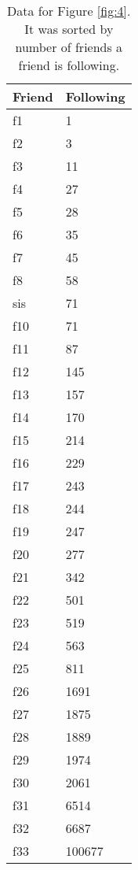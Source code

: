 \begin{table}[!htbp]
	\caption{Twitter Following Friends Data} \label{tab:table4}
	\small
	\begin{center}
	\vspace{-5mm}
	\begin{minipage}{0.22\textwidth}
		\begin{tabular}{|l | l|}
			\hline
			\multicolumn{1}{|c|}{Friend} & \multicolumn{1}{c|}{Following}\\
			\hline
			f1  & 1\\
			f2  & 3\\
			f3  & 11\\
			f4  & 27\\
			f5  & 28\\
			f6  & 35\\
			f7  & 45\\
			f8  & 58\\
			sis  & 71\\
			f10  & 71\\
			f11  & 87\\
			f12  & 145\\
			f13  & 157\\
			f14  & 170\\
			f15  & 214\\
			f16  & 229\\
			f17  & 243\\
			f18  & 244\\
			f19  & 247\\
			f20  & 277\\
			f21  & 342\\
			f22  & 501\\
			f23  & 519\\
			f24  & 563\\
			f25  & 811\\
			f26  & 1691\\
			f27  & 1875\\
			f28  & 1889\\
			f29  & 1974\\
			f30  & 2061\\
			f31  & 6514\\
			f32  & 6687\\
			f33  & 100677\\
			\hline
		\end{tabular}
	\end{minipage}	
	\caption*{\scriptsize Data for Figure \ref{fig:4}. It was sorted by number of friends a friend is following.}
	 \end{center}
\end{table}